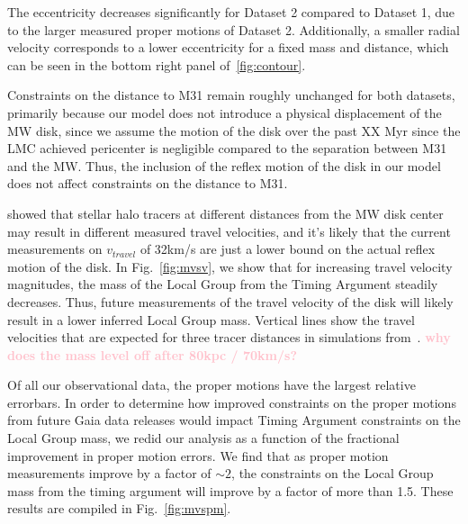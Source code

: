 \documentclass[twocolumn]{aastex631}
\newcommand{\kc}[1]{\textcolor{pink}{\textbf{#1}} }
\begin{document}
The eccentricity decreases significantly for Dataset 2 compared to Dataset 1, due to the larger measured proper motions of Dataset 2.  Additionally, a smaller radial velocity corresponds to a lower eccentricity for a fixed mass and distance, which can be seen in the bottom right panel of~\ref{fig:contour}.

Constraints on the distance to M31 remain roughly unchanged for both datasets, primarily because our model does not introduce a physical displacement of the MW disk, since we assume the motion of the disk over the past XX Myr since the LMC achieved pericenter is negligible compared to the separation between M31 and the MW. Thus, the inclusion of the reflex motion of the disk in our model does not affect constraints on the distance to M31. 


\cite{Garavito-Camargo2021b} showed that stellar halo tracers at different distances from the MW disk center may result in different measured travel velocities, and it's likely that the current measurements on $v_{travel}$ of 32km/s are just a lower bound on the actual reflex motion of the disk. In Fig.~\ref{fig:mvsv}, we show that for increasing travel velocity magnitudes, the mass of the Local Group from the Timing Argument steadily decreases. Thus, future measurements of the travel velocity of the disk will likely result in a lower inferred Local Group mass. Vertical lines show the travel velocities that are expected for three tracer distances in simulations from~\cite{Garavito-Camargo2021b}. \kc{why does the mass level off after 80kpc / 70km/s? }

Of all our observational data, the proper motions have the largest relative errorbars. In order to determine how improved constraints on the proper motions from future Gaia data releases would impact Timing Argument constraints on the Local Group mass, we redid our analysis as a function of the fractional improvement in proper motion errors. 
We find that as proper motion measurements improve by a factor of $\sim2$, the constraints on the Local Group mass from the timing argument will improve by a factor of more than 1.5. These results are compiled in Fig.~\ref{fig:mvspm}.
\end{document}
